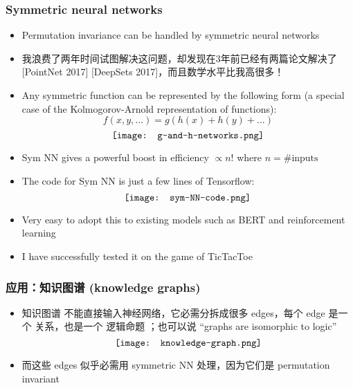 \documentclass[16pt]{beamer}
\newcommand{\cc}[2]{#1}
\newcommand{\cc}[2]{#2}
\newcommand{\emp}[1]{{\color{violet}#1}}
\begin{document}
\begin{frame}
\frametitle{Symmetric neural networks}
\begin{itemize}
	\item Permutation invariance can be handled by \emp{symmetric} neural networks

	\item \cc{我浪费了两年时间试图解决这问题，却发现在3年前已经有两篇论文解决了 [PointNet 2017] [DeepSets 2017]，而且数学水平比我高很多！
	}
	{I wasted 2 years trying to solve this problem, but found out that it has been solved 3 years ago:  [PointNet 2017] and [DeepSets 2018] and their mastery of mathematics is significantly above me!}

	\item Any symmetric function can be represented by the following form (a special case of the Kolmogorov-Arnold representation of functions):
	\begin{equation}
	f(x, y, ...) = g(h(x) + h(y) + ... )
	\end{equation}
	\begin{equation}
	\vcenter{\hbox{\texttt{[image: g-and-h-networks.png]}}}
	\end{equation}
\end{itemize}
\nocite{Qi2017a}
\nocite{Zaheer2017}
\end{frame}

\begin{frame}[plain]
\begin{itemize}
	\item Sym NN gives a powerful boost in efficiency $\propto n!$ where $n = \# \mbox{inputs}$

	\item The code for Sym NN is just a few lines of Tensorflow:
	\begin{equation}
	\vcenter{\hbox{\texttt{[image: sym-NN-code.png]}}}
	\end{equation}
	\item Very easy to adopt this to existing models such as BERT and reinforcement learning
	\item I have successfully tested it on the game of TicTacToe
\end{itemize}
\end{frame}

\begin{frame}
\frametitle{应用：知识图谱 (knowledge graphs)}
\begin{itemize}
	\item 知识图谱 不能直接输入神经网络，它必需分拆成很多 edges，每个 edge 是一个 \emp{关系}，也是一个 \emp{逻辑命题} ；也可以说 ``graphs are isomorphic to logic''
	\begin{equation}
	\vcenter{\hbox{\texttt{[image: knowledge-graph.png]}}}
	\end{equation}
	\item 而这些 edges 似乎必需用 \emp{symmetric} NN 处理，因为它们是 permutation invariant
\end{itemize}
\end{frame}
\end{document}
